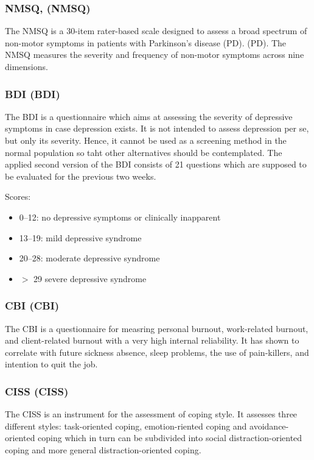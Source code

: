 \subsubsection{\acl{NMSQ}, (\acs{NMSQ})}
The \ac{NMSQ} is a 30-item rater-based scale designed to assess a broad
spectrum of non-motor symptoms in patients with Parkinson's disease
(PD).  (PD). The \ac{NMSQ} measures the severity and frequency of non-motor
symptoms across nine dimensions.

\subsubsection{\acl{BDI} (\acs{BDI})}
The \ac{BDI} is a questionnaire which aims at assessing the severity of depressive symptoms in case depression exists. It is not intended to assess depression per se, but only its severity. Hence, it cannot be used as a screening method in the normal population so taht other alternatives should be contemplated. The applied second version of the \ac{BDI} consists of  21 questions which are supposed to be evaluated for the previous two weeks. 

Scores:
\begin{itemize}\itemsep2pt
\item 0–12: no depressive symptoms or clinically inapparent
\item 13–19: mild depressive syndrome
\item 20–28: moderate depressive syndrome
\item $>$ 29 severe depressive syndrome
\end{itemize}

\subsubsection{\acl{CBI} (\acs{CBI})}
The \ac{CBI} is a questionnaire for measring personal burnout, work-related burnout, and client-related burnout with a very high internal reliability. It has shown to correlate with future sickness absence, sleep problems, the use of pain-killers, and intention to quit the job. 

\subsubsection{\acl{CISS} (\acs{CISS})}
The \ac{CISS} is an instrument for the assessment of coping style. It assesses three different styles: task-oriented coping, emotion-riented coping and avoidance-oriented coping which in turn can be subdivided into social distraction-oriented coping and more general distraction-oriented coping.

